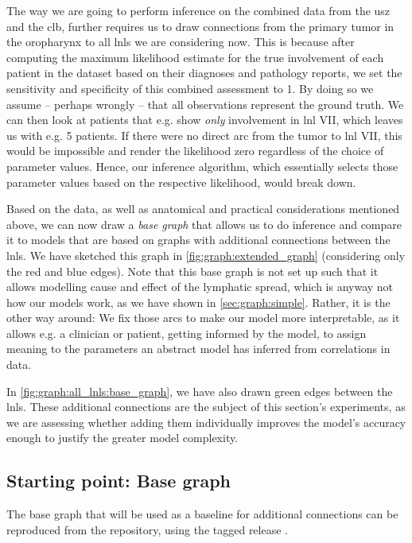 \documentclass[\relativeRoot/main.tex]{subfiles}
\begin{document}
The way we are going to perform inference on the combined data from the \gls{usz} and the \gls{clb}, further requires us to draw connections from the primary tumor in the oropharynx to all \glspl{lnl} we are considering now. This is because after computing the maximum likelihood estimate for the true involvement of each patient in the dataset based on their diagnoses and pathology reports, we set the sensitivity and specificity of this combined assessment to 1. By doing so we assume -- perhaps wrongly -- that all observations represent the ground truth. We can then look at patients that e.g. show \emph{only} involvement in \gls{lnl} VII, which leaves us with e.g. 5 patients. If there were no direct arc from the tumor to \gls{lnl} VII, this would be impossible and render the likelihood zero regardless of the choice of parameter values. Hence, our inference algorithm, which essentially selects those parameter values based on the respective likelihood, would break down.

Based on the data, as well as anatomical and practical considerations mentioned above, we can now draw a \emph{base graph} that allows us to do inference and compare it to models that are based on graphs with additional connections between the \glspl{lnl}. We have sketched this graph in \cref{fig:graph:extended_graph} (considering only the red and blue edges). Note that this base graph is not set up such that it allows modelling cause and effect of the lymphatic spread, which is anyway not how our models work, as we have shown in \cref{sec:graph:simple}. Rather, it is the other way around: We fix those arcs to make our model more interpretable, as it allows e.g. a clinician or patient, getting informed by the model, to assign meaning to the parameters an abstract model has inferred from correlations in data.

In \cref{fig:graph:all_lnls:base_graph}, we have also drawn green edges between the \glspl{lnl}. These additional connections are the subject of this section's experiments, as we are assessing whether adding them individually improves the model's accuracy enough to justify the greater model complexity.

\subsection{Starting point: Base graph}
\label{subsec:graph:extended:base}

\begin{tcolorbox}[title=\faIcon{recycle} Reproducibility, parbox=false]
    The base graph that will be used as a baseline for additional connections can be reproduced from the  repository, using the tagged release .
\end{tcolorbox}
\end{document}
